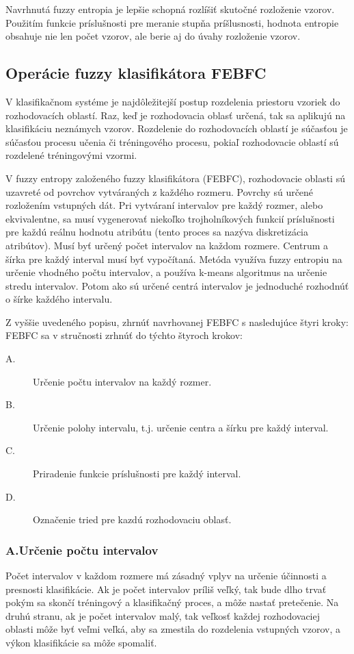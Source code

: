 Navrhnutá fuzzy entropia je lepšie schopná rozlíšiť skutočné rozloženie vzorov. Použitím funkcie príslušnosti pre meranie stupňa príšlusnosti, hodnota entropie obsahuje nie len počet vzorov, ale berie aj do úvahy rozloženie vzorov.  
 

\subsection{Operácie fuzzy klasifikátora FEBFC}

V klasifikačnom systéme je najdôležitejší postup rozdelenia priestoru vzoriek do rozhodovacích oblastí. Raz, keď je rozhodovacia oblasť určená, tak sa aplikujú na klasifikáciu neznámych vzorov.  Rozdelenie do rozhodovacích oblastí je súčasťou je súčasťou procesu učenia či tréningového procesu, pokiaľ rozhodovacie oblastí sú rozdelené tréningovými vzormi. 

V fuzzy entropy založeného fuzzy klasifikátora (FEBFC), rozhodovacie oblasti sú uzavreté od povrchov vytváraných z každého rozmeru. Povrchy sú určené rozložením vstupných dát.  
Pri vytváraní intervalov pre každý rozmer, alebo ekvivalentne, sa musí vygenerovať niekoľko trojholníkových funkcií príslušnosti pre každú reálnu hodnotu atribútu (tento proces sa nazýva diskretizácia atribútov). 
Musí byť určený počet intervalov na každom rozmere. Centrum a šírka pre každý interval musí byť vypočítaná. Metóda využíva fuzzy entropiu na určenie vhodného počtu intervalov, a používa k-means algoritmus na určenie stredu intervalov. Potom ako sú určené centrá intervalov je jednoduché rozhodnúť o šírke každého intervalu. 

Z vyššie uvedeného popisu, zhrnúť navrhovanej FEBFC s nasledujúce štyri kroky:
FEBFC sa v stručnosti zrhnúť do týchto štyroch krokov:  
\begin{description}
\item[A.] Určenie počtu intervalov na každý rozmer.
\item[B.] Určenie polohy intervalu, t.j. určenie centra a šírku pre každý interval. 
\item[C.] Priradenie funkcie príslušnosti pre každý interval. 
\item[D.] Označenie tried pre kazdú rozhodovaciu oblasť. 
\end{description}

\subsubsection{A.Určenie počtu intervalov}
Počet intervalov v každom rozmere má zásadný vplyv na určenie účinnosti a presnosti klasifikácie. Ak je počet intervalov príliš veľký, tak bude dlho trvať pokým sa skončí tréningový a klasifikačný proces, a môže nastať pretečenie. 
Na druhú stranu, ak je počet intervalov malý, tak veľkosť každej rozhodovaciej oblasti môže byť veľmi veľká, aby sa zmestila do rozdelenia vstupných vzorov, a výkon klasifikácie sa môže spomaliť. 

